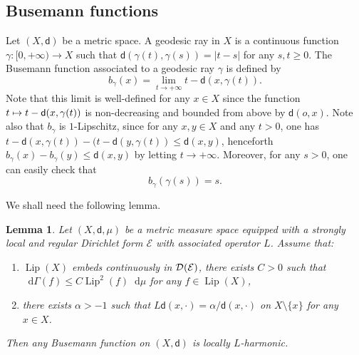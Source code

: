 \documentclass[JEP,XML,SOM,Unicode,published]{cedram}
\newcommand\mto{\mathchoice{\longmapsto}{\mapsto}{\mapsto}{\mapsto}}
\let\backslash\setminus
\newcommand{\NoChangel}[1]{%
\expandafter\let\csname old\string#1\endcsname=#1
\let#1=\relax
\newcommand{#1}{\mathcode`l="716C\csname old\string#1\endcsname\mathcode`l="7160 }%
}
\theoremstyle{plain}
\newtheorem{lemma}[theorem]{Lemma}
\theoremstyle{definition}
\newcommand{\cE}{\mathcal{E}}
\newcommand{\cD}{\mathcal{D}}
\newcommand{\di}{\mathop{}\!\mathrm{d}}
\newcommand{\loc}{\mathrm{loc}}\NoChangel{\loc}
\DeclareMathOperator{\Lip}{Lip}
\newcommand{\dist}{\mathsf{d}}
\begin{document}
\subsection*{Busemann functions}

Let $(X,\dist)$ be a metric space. A geodesic ray in $X$ is a continuous function $\gamma:[0,+\infty)\to X$ such that $\dist(\gamma(t),\gamma(s))=|t-s|$ for any $s,t\ge 0$. The Busemann function associated to a geodesic ray $\gamma$ is defined by
\[
b_\gamma(x)=\lim_{t \to +\infty} t - \dist(x,\gamma(t)).
\]
Note that this limit is well-defined for any $x \in X$ since the function $t \mto t - \dist(x,\gamma(t))$ is non-decreasing and bounded from above by $\dist(o,x)$. Note also that $b_\gamma$ is $1$-Lipschitz, since for any $x, y \in X$ and any $t>0$, one has $t - \dist(x,\gamma(t)) - (t - \dist(y,\gamma(t)) \le \dist(x,y)$, henceforth $b_\gamma(x) - b_\gamma(y) \le \dist(x,y)$ by letting $t \to +\infty$. Moreover, for any $s>0$, one can easily check that
\begin{equation}%
b_\gamma(\gamma(s))=s.
\end{equation}

We shall need the following lemma.

\begin{lemma}\label{lem:preparatory}
Let $(X,\dist,\mu)$ be a metric measure space equipped with a strongly local and regular Dirichlet form $\cE$ with associated operator $L$. Assume that:
\begin{enumerate}
\item\label{lem:preparatory1} $\Lip(X)$ embeds continuously in $\cD_{\loc}(\cE)$, \ie there exists $C>0$ such that $\di\Gamma(f)\le C \Lip^2(f)\di \mu$ for any $f \in \Lip(X)$,
\item\label{lem:preparatory2} there exists $\alpha>-1$ such that $L\dist(x,\cdot)=\alpha/\dist(x,\cdot)$ on $X\backslash \{x\}$ for any $x \in X$.
\end{enumerate}
Then any Busemann function on $(X,\dist)$ is locally $L$-harmonic.
\end{lemma}
\end{document}

